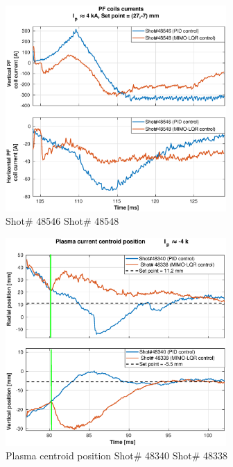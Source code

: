\begin{figure}
	\centering
	\includegraphics[width=0.75\textwidth]{Chp5/PIDvsMIMO_546_548_curr_2.eps}
	\caption{  Shot\# 48546 Shot\# 48548}
\end{figure}

\begin{figure}
	\centering
	\includegraphics[width=0.75\textwidth]{Chp5/PIDvsMIMO_340_338_2.eps}
	\caption{Plasma centroid position  Shot\# 48340 Shot\# 48338}
\end{figure}

